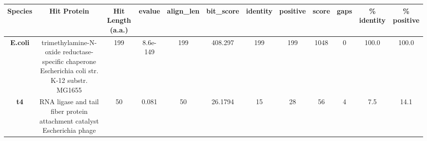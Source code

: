 \begin{tabular}{|c|c|c|c|c|c|c|c|c|c|c|c|} \hline
\textbf{Species} & \textbf{Hit Protein} & \textbf{Hit Length (a.a.)} & \textbf{evalue} & \textbf{align\_len} & \textbf{bit\_score} & \textbf{identity} & \textbf{positive} & \textbf{score} & \textbf{gaps} & \textbf{\% identity} & \textbf{\% positive} \\ \hline
\textbf{E.coli} & trimethylamine-N-oxide reductase-specific chaperone Escherichia coli str. K-12 substr. MG1655 & 199 & 8.6e-149 & 199 & 408.297 & 199 & 199 & 1048 & 0 & 100.0 & 100.0\\
\textbf{t4} & RNA ligase and tail fiber protein attachment catalyst Escherichia phage  & 50 & 0.081 & 50 & 26.1794 & 15 & 28 & 56 & 4 & 7.5 & 14.1\\
\hline \end{tabular}
